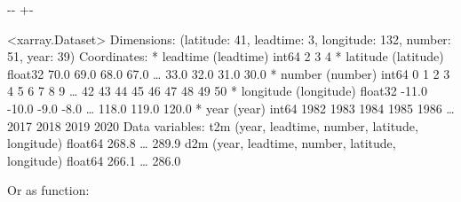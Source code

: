 \documentclass[letterpaper,10pt,english]{sphinxmanual}
\newlength\nbsphinxcodecellspacing
\begin{document}
{

\kern-\sphinxverbatimsmallskipamount\kern-\baselineskip
\kern+\FrameHeightAdjust\kern-\fboxrule
\vspace{\nbsphinxcodecellspacing}

\begin{sphinxVerbatim}[commandchars=\\\{\}]
\llap{\color{nbsphinxout}[30]:\,\hspace{\fboxrule}\hspace{\fboxsep}}<xarray.Dataset>
Dimensions:    (latitude: 41, leadtime: 3, longitude: 132, number: 51, year: 39)
Coordinates:
  * leadtime   (leadtime) int64 2 3 4
  * latitude   (latitude) float32 70.0 69.0 68.0 67.0 {\ldots} 33.0 32.0 31.0 30.0
  * number     (number) int64 0 1 2 3 4 5 6 7 8 9 {\ldots} 42 43 44 45 46 47 48 49 50
  * longitude  (longitude) float32 -11.0 -10.0 -9.0 -8.0 {\ldots} 118.0 119.0 120.0
  * year       (year) int64 1982 1983 1984 1985 1986 {\ldots} 2017 2018 2019 2020
Data variables:
    t2m        (year, leadtime, number, latitude, longitude) float64 268.8 {\ldots} 289.9
    d2m        (year, leadtime, number, latitude, longitude) float64 266.1 {\ldots} 286.0
\end{sphinxVerbatim}
}

Or as function:
\end{document}
